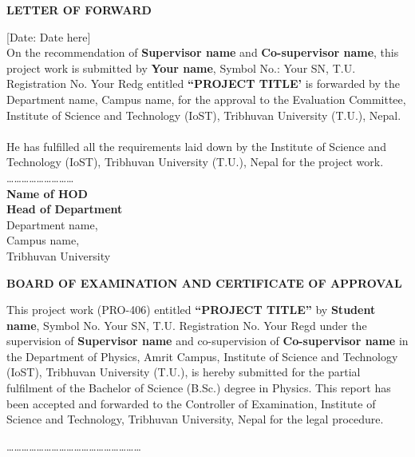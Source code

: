 \newpage
{}
{}
\begin{center}
\Large\bf {LETTER OF FORWARD}
\end{center}
\vspace{0.9cm} 
[Date: Date here]\\
On the recommendation of {\bf Supervisor name} and {\bf Co-supervisor name}, this project work is submitted by {\bf Your name},
Symbol No.: Your SN, T.U. Registration No. Your Redg entitled {\bf ``PROJECT TITLE'} is
forwarded by the Department name, Campus name, for
the approval to the Evaluation Committee, Institute of Science and Technology (IoST), Tribhuvan University (T.U.), Nepal.\\
\\
He has fulfilled all the requirements laid down by the Institute of Science and Technology (IoST), Tribhuvan University (T.U.), Nepal for the project work.
\vfill \noindent
\dots\dots\dots\dots\dots\dots\dots\dots\dots\\ 
\textbf{Name of HOD} \\
\textbf{Head of Department}\\
Department name,\\
Campus name,\\
Tribhuvan University
\vfill
\newpage
{}
{}
\begin{center}
\fontsize{16}{16} \textbf{BOARD OF EXAMINATION AND CERTIFICATE OF APPROVAL}
\end{center}
\vspace{0.8cm}
This project work (PRO-406) entitled {\bf ``PROJECT TITLE''} by {\bf Student name}, Symbol No. Your SN, T.U. Registration No. Your Regd under the supervision of {\bf Supervisor name} and co-supervision of {\bf Co-supervisor name} in the Department of Physics, Amrit Campus, Institute of Science and Technology (IoST), Tribhuvan University (T.U.), is hereby submitted for the partial fulfilment of the Bachelor of Science
(B.Sc.) degree in Physics. This report has been accepted and forwarded to the Controller of Examination, Institute of Science and Technology, Tribhuvan University, Nepal for the legal procedure.\\
\par
\noindent
\dots\dots\dots\dots\dots\dots\dots\dots\dots \hfill \dots\dots\dots\dots\dots\dots\dots\dots\dots\\
